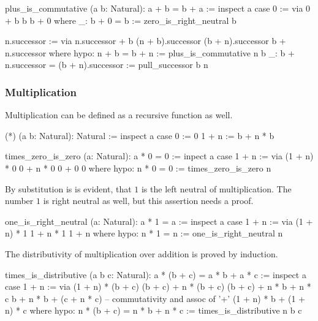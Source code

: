 \begin{alba}
   plus_is_commutative (a b: Natural): a + b = b + a :=
     inspect a case
       0 :=
         via 0 + b
             b
             b + 0
         where
           _: b + 0 = b := zero_is_right_neutral b

       n.successor :=
         via
           n.successor + b
           (n + b).successor
           (b + n).successor
           b + n.successor
         where
           hypo: n + b = b + n := plus_is_commutative n b
           _: b + n.successor = (b + n).successor := pull_successor b n
\end{alba}





\subsubsection{Multiplication}



Multiplication can be defined as a recursive function as well.

\begin{alba}
  (*) (a b: Natural): Natural :=
    inspect a case
      0 :=
        0
      1 + n :=
        b + n * b
\end{alba}

\begin{alba}
  times_zero_is_zero (a: Natural): a * 0 = 0 :=
    inpect a case
      1 + n :=
       via (1 + n) * 0
           0 + n * 0
           0 + 0
           0
       where
         hypo: n * 0 = 0 := times_zero_is_zero n
\end{alba}

By substitution is is evident, that $1$ is the left neutral of
multiplication. The number $1$ is right neutral as well, but this assertion
needs a proof.

\begin{alba}
  one_is_right_neutral (a: Natural): a * 1 = a :=
    inspect a case
      1 + n :=
        via
          (1 + n) * 1
          1 + n * 1
          1 + n
        where
          hypo: n * 1 = n := one_is_right_neutral n
\end{alba}


The distributivity of multiplication over addition is proved by induction.
%
\begin{alba}
   times_is_distributive (a b c: Natural): a * (b + c) = a * b + a * c :=
      inspect a case
        1 + n :=
          via
            (1 + n) * (b + c)
            (b + c) + n * (b + c)
            (b + c) + n * b + n * c
            b + n * b + (c + n * c)    -- commutativity and assoc of '+'
            (1 + n) * b + (1 + n) * c
          where
            hypo: n * (b + c) = n * b + n * c :=
              times_is_distributive n b c
\end{alba}


